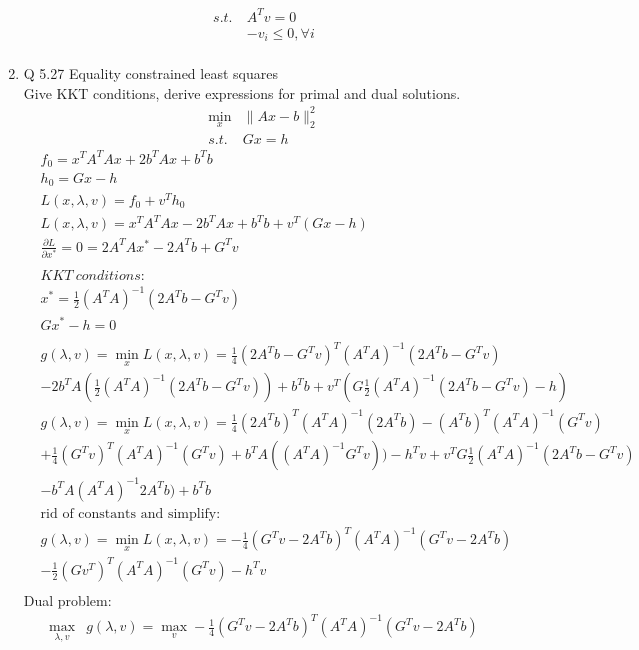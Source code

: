 \documentclass[12pt,letter]{article}
\newcommand{\norm}[1]{\|#1\|}
\begin{document}
\begin{enumerate}
\begin{align*}
    s.t.\ &A^Tv = 0\\
    &-v_i \leq 0, \forall i\\
  \end{align*}
  \pagebreak
\item Q 5.27 Equality constrained least squares\\
  Give KKT conditions, derive expressions for primal and dual solutions.
  \begin{align*}
    \min_x & \norm{Ax-b}_2^2\\
    s.t.\ & Gx=h            
  \end{align*}
  \begin{align*}
    &f_0 = x^TA^TAx + 2b^TAx + b^Tb\\
    &h_0 = Gx-h\\
    &L(x,\lambda,v) = f_0 + v^Th_0\\
    &L(x,\lambda,v) = x^TA^TAx - 2b^TAx + b^Tb + v^T(Gx-h)\\
    &\frac{\partial L}{\partial x^*} = 0 = 2A^TAx^* - 2A^Tb + G^Tv\\
    \\
    &KKT\ conditions:\\
    &x^* = \frac{1}{2}(A^TA)^{-1}(2A^Tb - G^Tv)\\
    &Gx^*-h = 0\\
    \\
    &g(\lambda,v)= \min_x L(x,\lambda,v) = \frac{1}{4}(2A^Tb-G^Tv)^T(A^TA)^{-1}(2A^Tb-G^Tv)\\
    &-2b^TA(\frac{1}{2}(A^TA)^{-1}(2A^Tb-G^Tv)) + b^Tb + v^T(G\frac{1}{2}(A^TA)^{-1}(2A^Tb-G^Tv)-h)\\
    &g(\lambda,v)= \min_x L(x,\lambda,v) = \frac{1}{4}(2A^Tb)^T(A^TA)^{-1}(2A^Tb)-(A^Tb)^T(A^TA)^{-1}(G^Tv)\\
    &+\frac{1}{4}(G^Tv)^T(A^TA)^{-1}(G^Tv) +b^TA((A^TA)^{-1}G^Tv)) -h^Tv + v^TG\frac{1}{2}(A^TA)^{-1}(2A^Tb-G^Tv) \\
    &- b^TA(A^TA)^{-1}2A^Tb) + b^Tb\\
    &\text{rid of constants and simplify}:\\
    &g(\lambda,v)= \min_x L(x,\lambda,v) = -\frac{1}{4}(G^Tv-2A^Tb)^T(A^TA)^{-1}(G^Tv-2A^Tb) \\
    &-\frac{1}{2}(Gv^T)^T(A^TA)^{-1}(G^Tv) -h^Tv\\
  \end{align*}
  Dual problem:
  \begin{align*}
    \max_{\lambda,v} & g(\lambda,v) = \max_v -\frac{1}{4}(G^Tv-2A^Tb)^T(A^TA)^{-1}(G^Tv-2A^Tb) \\

\end{align*}
\end{enumerate}
\end{document}
